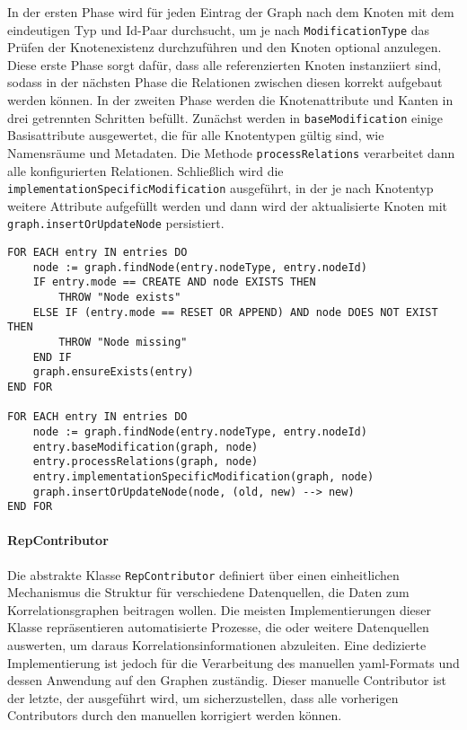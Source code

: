 In der ersten Phase wird für jeden Eintrag der Graph nach dem Knoten mit dem eindeutigen Typ und Id-Paar durchsucht, um je nach \texttt{ModificationType} das Prüfen der Knotenexistenz durchzuführen und den Knoten optional anzulegen.
Diese erste Phase sorgt dafür, dass alle referenzierten Knoten instanziiert sind, sodass in der nächsten Phase die Relationen zwischen diesen korrekt aufgebaut werden können.
In der zweiten Phase werden die Knotenattribute und Kanten in drei getrennten Schritten befüllt.
Zunächst werden in \texttt{baseModification} einige Basisattribute ausgewertet, die für alle Knotentypen gültig sind, wie Namensräume und Metadaten.
Die Methode \texttt{processRelations} verarbeitet dann alle konfigurierten Relationen.
Schließlich wird die \texttt{implementationSpecificModification} ausgeführt, in der je nach Knotentyp weitere Attribute aufgefüllt werden und dann wird der aktualisierte Knoten mit \texttt{graph.insertOrUpdateNode} persistiert.

\begin{lstlisting}[language=pseudo,caption={Ablauf des Modifikationssystems für eine Menge an Modifikationen},label=lst:modifikation-pseudocode,basicstyle=\ttfamily\scriptsize]
FOR EACH entry IN entries DO
    node := graph.findNode(entry.nodeType, entry.nodeId)
    IF entry.mode == CREATE AND node EXISTS THEN
        THROW "Node exists"
    ELSE IF (entry.mode == RESET OR APPEND) AND node DOES NOT EXIST THEN
        THROW "Node missing"
    END IF
    graph.ensureExists(entry)
END FOR

FOR EACH entry IN entries DO
    node := graph.findNode(entry.nodeType, entry.nodeId)
    entry.baseModification(graph, node)
    entry.processRelations(graph, node)
    entry.implementationSpecificModification(graph, node)
    graph.insertOrUpdateNode(node, (old, new) --> new)
END FOR
\end{lstlisting}

\paragraph{RepContributor}

Die abstrakte Klasse \texttt{RepContributor} definiert über einen einheitlichen Mechanismus die Struktur für verschiedene Datenquellen, die Daten zum Korrelationsgraphen beitragen wollen.
Die meisten Implementierungen dieser Klasse repräsentieren automatisierte Prozesse, die  oder weitere Datenquellen auswerten, um daraus Korrelationsinformationen abzuleiten.
Eine dedizierte Implementierung ist jedoch für die Verarbeitung des manuellen \acrshort{yaml}-Formats und dessen Anwendung auf den Graphen zuständig.
Dieser manuelle Contributor ist der letzte, der ausgeführt wird, um sicherzustellen, dass alle vorherigen Contributors durch den manuellen korrigiert werden können.

